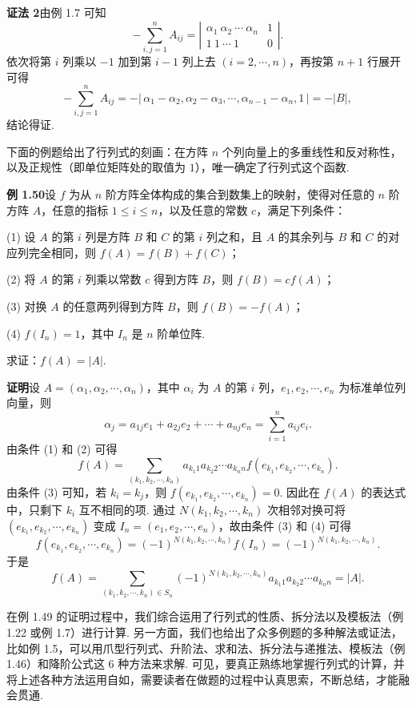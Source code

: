 \documentclass[UTF8,12pt,a4paper,fontset=fandol]{ctexart}
\begin{document}
\noindent\textbf{证法 2}\quad 由例 1.7 可知
\[
-\sum_{i,j=1}^n A_{ij}
=\left|\begin{array}{cc}
\alpha_1\ \alpha_2\ \cdots\ \alpha_n & 1\\
1\ 1\ \cdots\ 1 & 0
\end{array}\right|.
\]
依次将第 $i$ 列乘以 $-1$ 加到第 $i-1$ 列上去 $(i=2,\cdots,n)$，再按第 $n+1$ 行展开可得
\[
-\sum_{i,j=1}^n A_{ij}
=-|\,\alpha_1-\alpha_2,\alpha_2-\alpha_3,\cdots,\alpha_{n-1}-\alpha_n,1\,|
=-|B|,
\]
结论得证.

下面的例题给出了行列式的刻画：在方阵 $n$ 个列向量上的多重线性和反对称性，以及正规性（即单位矩阵处的取值为 $1$），唯一确定了行列式这个函数.

\noindent\textbf{例 1.50}\quad 设 $f$ 为从 $n$ 阶方阵全体构成的集合到数集上的映射，使得对任意的 $n$ 阶方阵 $A$，任意的指标 $1\le i\le n$，以及任意的常数 $c$，满足下列条件：

(1) 设 $A$ 的第 $i$ 列是方阵 $B$ 和 $C$ 的第 $i$ 列之和，且 $A$ 的其余列与 $B$ 和 $C$ 的对应列完全相同，则 $f(A)=f(B)+f(C)$；

(2) 将 $A$ 的第 $i$ 列乘以常数 $c$ 得到方阵 $B$，则 $f(B)=cf(A)$；

(3) 对换 $A$ 的任意两列得到方阵 $B$，则 $f(B)=-f(A)$；

(4) $f(I_n)=1$，其中 $I_n$ 是 $n$ 阶单位阵.

求证：$f(A)=|A|$.

\noindent\textbf{证明}\quad 设 $A=(\alpha_1,\alpha_2,\cdots,\alpha_n)$，其中 $\alpha_i$ 为 $A$ 的第 $i$ 列，$e_1,e_2,\cdots,e_n$ 为标准单位列向量，则
\[
\alpha_j=a_{1j}e_1+a_{2j}e_2+\cdots+a_{nj}e_n=\sum_{i=1}^n a_{ij}e_i.
\]
由条件 (1) 和 (2) 可得
\[
f(A)=\sum_{(k_1,k_2,\cdots,k_n)}
a_{k_1 1}a_{k_2 2}\cdots a_{k_n n}f(e_{k_1},e_{k_2},\cdots,e_{k_n}).
\]
由条件 (3) 可知，若 $k_i=k_j$，则 $f(e_{k_1},e_{k_2},\cdots,e_{k_n})=0$. 因此在 $f(A)$ 的表达式中，只剩下 $k_i$ 互不相同的项. 通过 $N(k_1,k_2,\cdots,k_n)$ 次相邻对换可将 $(e_{k_1},e_{k_2},\cdots,e_{k_n})$ 变成 $I_n=(e_1,e_2,\cdots,e_n)$，故由条件 (3) 和 (4) 可得
\[
f(e_{k_1},e_{k_2},\cdots,e_{k_n})=(-1)^{N(k_1,k_2,\cdots,k_n)}f(I_n)
=(-1)^{N(k_1,k_2,\cdots,k_n)}.
\]
于是
\[
f(A)=\sum_{(k_1,k_2,\cdots,k_n)\in S_n}
(-1)^{N(k_1,k_2,\cdots,k_n)}a_{k_1 1}a_{k_2 2}\cdots a_{k_n n}=|A|.
\]

在例 1.49 的证明过程中，我们综合运用了行列式的性质、拆分法以及模板法（例 1.22 或例 1.7）进行计算. 另一方面，我们也给出了众多例题的多种解法或证法，比如例 1.5，可以用爪型行列式、升阶法、求和法、拆分法与递推法、模板法（例 1.46）和降阶公式这 6 种方法来求解. 可见，要真正熟练地掌握行列式的计算，并将上述各种方法运用自如，需要读者在做题的过程中认真思索，不断总结，才能融会贯通.
\end{document}
